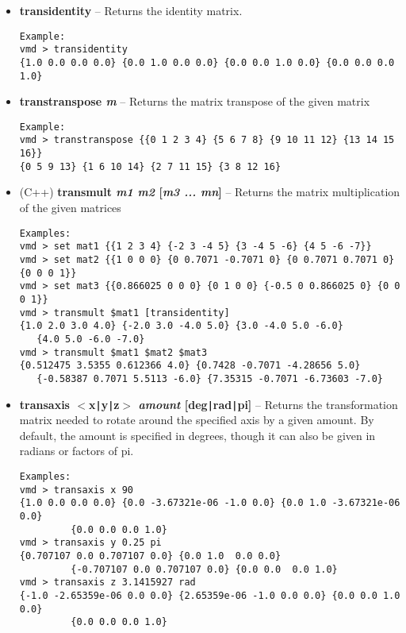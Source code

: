 \begin{itemize}
\item {\bf transidentity} --
Returns the identity matrix.
\begin{verbatim}
Example:
vmd > transidentity
{1.0 0.0 0.0 0.0} {0.0 1.0 0.0 0.0} {0.0 0.0 1.0 0.0} {0.0 0.0 0.0 1.0}
\end{verbatim}

\item {\bf transtranspose {\it m}} --
Returns the matrix transpose of the given matrix
\begin{verbatim}
Example:
vmd > transtranspose {{0 1 2 3 4} {5 6 7 8} {9 10 11 12} {13 14 15 16}}
{0 5 9 13} {1 6 10 14} {2 7 11 15} {3 8 12 16}
\end{verbatim}

\item (C++) {\bf transmult {\it m1 m2} [{\it m3 ... mn}]} --
Returns the matrix multiplication of the given matrices
\begin{verbatim}
Examples:
vmd > set mat1 {{1 2 3 4} {-2 3 -4 5} {3 -4 5 -6} {4 5 -6 -7}}
vmd > set mat2 {{1 0 0 0} {0 0.7071 -0.7071 0} {0 0.7071 0.7071 0} {0 0 0 1}}
vmd > set mat3 {{0.866025 0 0 0} {0 1 0 0} {-0.5 0 0.866025 0} {0 0 0 1}}
vmd > transmult $mat1 [transidentity]
{1.0 2.0 3.0 4.0} {-2.0 3.0 -4.0 5.0} {3.0 -4.0 5.0 -6.0} 
   {4.0 5.0 -6.0 -7.0}
vmd > transmult $mat1 $mat2 $mat3
{0.512475 3.5355 0.612366 4.0} {0.7428 -0.7071 -4.28656 5.0}
   {-0.58387 0.7071 5.5113 -6.0} {7.35315 -0.7071 -6.73603 -7.0}
\end{verbatim}

\item {\bf transaxis $<$x\verb!|!y\verb!|!z$>$ 
{\it amount} [deg\verb!|!rad\verb!|!pi]} --
Returns the transformation matrix needed to rotate around the
specified axis by a given amount.  By default, the amount is specified
in degrees, though it can also be given in radians or factors of pi.
\begin{verbatim}
Examples:
vmd > transaxis x 90
{1.0 0.0 0.0 0.0} {0.0 -3.67321e-06 -1.0 0.0} {0.0 1.0 -3.67321e-06 0.0}
         {0.0 0.0 0.0 1.0}
vmd > transaxis y 0.25 pi
{0.707107 0.0 0.707107 0.0} {0.0 1.0  0.0 0.0} 
         {-0.707107 0.0 0.707107 0.0} {0.0 0.0  0.0 1.0}
vmd > transaxis z 3.1415927 rad
{-1.0 -2.65359e-06 0.0 0.0} {2.65359e-06 -1.0 0.0 0.0} {0.0 0.0 1.0 0.0}
         {0.0 0.0 0.0 1.0}
\end{verbatim}


\end{itemize}
